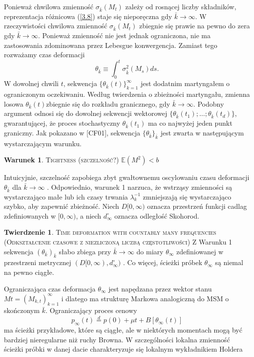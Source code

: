 \documentclass[12pt]{article}
\theoremstyle{definition}
\newtheorem{tw}{Twierdzenie}[section]
\newtheorem{war}{Warunek}[section]
\begin{document}
Ponieważ chwilowa zmienność $\sigma_{\bar{k}}(M_t)$ zależy od rosnącej liczby składników, reprezentacja różnicowa (\ref{3.8}) staje się nieporęczna gdy $\bar{k} \to \infty$. W rzeczywistości chwilowa zmienność $\sigma_{\bar{k}}(M_t)$ zbiegnie się prawie na pewno do zera gdy $\bar{k} \to \infty$. Ponieważ zmienność nie jest jednak ograniczona, nie ma zastosowania zdominowana przez Lebesgue konwergencja. Zamiast tego rozważamy czas deformacji
\begin{equation}
\label{3.10}
\theta_{\bar{k}} \equiv \int_{0}^{t} \sigma_{\bar{k}}^{2}(M_s)ds.
\end{equation}
W dowolnej chwili $t$, sekwencja $\{\theta_{\bar{k}}(t)\}_{k=1}^{\infty}$ jest dodatnim martyngałem o ograniczonym oczekiwaniu. Według twierdzenia o zbieżności martyngału, zmienna losowa $\theta_{\bar{k}}(t)$zbiegnie się do rozkładu granicznego, gdy $\bar{k} \to \infty$. Podobny argument odnosi się do dowolnej sekwencji wektorowej $\{ \theta_{\bar{k}} (t_1) ; \ldots ;\theta_{\bar{k}} (t_d) \}$, gwarantującej, że proces stochastyczny $\theta_{\bar{k}}(t_1)$ ma co najwyżej jeden punkt graniczny. Jak pokazano w [CF01], sekwencja $\{ \theta_{\bar{k}} \}_{\bar{k}}$ jest zwarta w następującym wystarczającym warunku.
\begin{war}{\textsc{Tightness (szczelność?)}}
$\mathbb{E}(M^2)<b$
\end{war}
Intuicyjnie, szczelność zapobiega zbyt gwałtownemu oscylowaniu czasu deformacji $\theta_{\bar{k}}$ dla $\bar{k} \to \infty$ . Odpowiednio, warunek 1 narzuca, że wstrząsy zmienności są wystarczająco małe lub ich czasy trwania $\lambda^{-1}_{k}$ zmniejszają się wystarczająco szybko, aby zapewnić zbieżność. Niech $D[0, \infty)$ oznacza przestrzeń funkcji cadlag zdefiniowanych w $[0, \infty)$, a niech $d_{\infty}^{\circ}$ oznacza odległość Skohorod.
\begin{tw}{\textsc{Time deformation with countably many frequencies (Odkształcenie czasowe z niezliczoną liczbą częstotliwości)}}
Z Warunku 1 sekwencja $(\theta_{\bar{k}})_{\bar{k}}$ słabo zbiega przy $\bar{k} \to \infty$ do miary $\theta_{\infty}$ zdefiniowanej w przestrzeni metrycznej $(D[0, \infty), d_{\infty}^{\circ})$ . Co więcej, ścieżki próbek $\theta_{\infty}$ są niemal na pewno ciągłe.
\end{tw}
Ograniczająca czas deformacja $\theta_{\infty}$ jest napędzana przez wektor stanu $Mt = (M_{k, t})^{\infty}_{k = 1}$ i dlatego ma strukturę Markowa analogiczną do MSM o skończonym $\bar{k}$.
Ograniczający proces cenowy
\begin{equation}
\label{3.11}
p_{\infty}(t) \stackrel{d}{=} p(0)+ \mu t + B[\theta_{\infty}(t)]
\end{equation}
ma ścieżki przykładowe, które są ciągłe, ale w niektórych momentach mogą być bardziej nieregularne niż ruchy Browna. W szczególności lokalna zmienność ścieżki próbki w danej dacie charakteryzuje się lokalnym wykładnikiem Holdera
\end{document}
